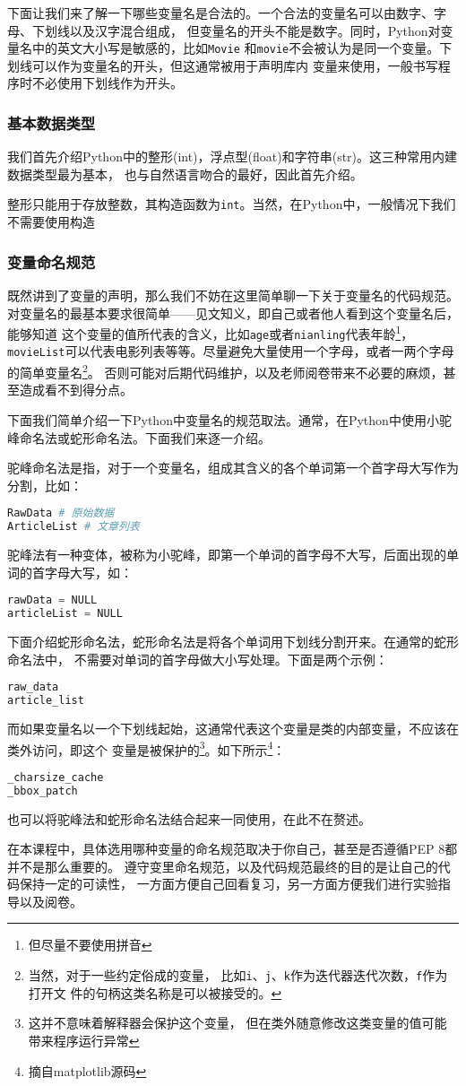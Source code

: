 下面让我们来了解一下哪些变量名是合法的。一个合法的变量名可以由数字、字母、下划线以及汉字混合组成，
但变量名的开头不能是数字。同时，Python对变量名中的英文大小写是敏感的，比如\texttt{Movie}
和\texttt{movie}不会被认为是同一个变量。下划线可以作为变量名的开头，但这通常被用于声明库内
变量来使用，一般书写程序时不必使用下划线作为开头。

\subsubsection{基本数据类型}
我们首先介绍Python中的整形(int)，浮点型(float)和字符串(str)。这三种常用内建数据类型最为基本，
也与自然语言吻合的最好，因此首先介绍。

整形只能用于存放整数，其构造函数为\texttt{int}。当然，在Python中，一般情况下我们不需要使用构造
\subsubsection{变量命名规范}
既然讲到了变量的声明，那么我们不妨在这里简单聊一下关于变量名的代码规范。
对变量名的最基本要求很简单——见文知义，即自己或者他人看到这个变量名后，能够知道
这个变量的值所代表的含义，比如\texttt{age}或者\texttt{nianling}代表年龄\footnote{但尽量不要使用拼音}，
\texttt{movieList}可以代表电影列表等等。尽量避免大量使用一个字母，或者一两个字母的简单变量名\footnote{当然，对于一些约定俗成的变量，
比如\texttt{i}、\texttt{j}、\texttt{k}作为迭代器迭代次数，\texttt{f}作为打开文
件的句柄这类名称是可以被接受的。}。
否则可能对后期代码维护，以及老师阅卷带来不必要的麻烦，甚至造成看不到得分点。

下面我们简单介绍一下Python中变量名的规范取法。通常，在Python中使用小驼峰命名法或蛇形命名法。下面我们来逐一介绍。

驼峰命名法是指，对于一个变量名，组成其含义的各个单词第一个首字母大写作为分割，比如：
\begin{lstlisting}[language=Python]
RawData # 原始数据
ArticleList # 文章列表
\end{lstlisting}
驼峰法有一种变体，被称为小驼峰，即第一个单词的首字母不大写，后面出现的单词的首字母大写，如：
\begin{lstlisting}[language=Python]
rawData = NULL
articleList = NULL
\end{lstlisting}

下面介绍蛇形命名法，蛇形命名法是将各个单词用下划线分割开来。在通常的蛇形命名法中，
不需要对单词的首字母做大小写处理。下面是两个示例：
\begin{lstlisting}[language=Python]
raw_data
article_list
\end{lstlisting}
而如果变量名以一个下划线起始，这通常代表这个变量是类的内部变量，不应该在类外访问，即这个
变量是被保护的\footnote{这并不意味着解释器会保护这个变量，
但在类外随意修改这类变量的值可能带来程序运行异常}。如下所示\footnote{摘自matplotlib源码}：
\begin{lstlisting}[language=Python]
_charsize_cache
_bbox_patch
\end{lstlisting}

也可以将驼峰法和蛇形命名法结合起来一同使用，在此不在赘述。

在本课程中，具体选用哪种变量的命名规范取决于你自己，甚至是否遵循PEP 8都并不是那么重要的。
遵守变里命名规范，以及代码规范最终的目的是让自己的代码保持一定的可读性，
一方面方便自己回看复习，另一方面方便我们进行实验指导以及阅卷。

